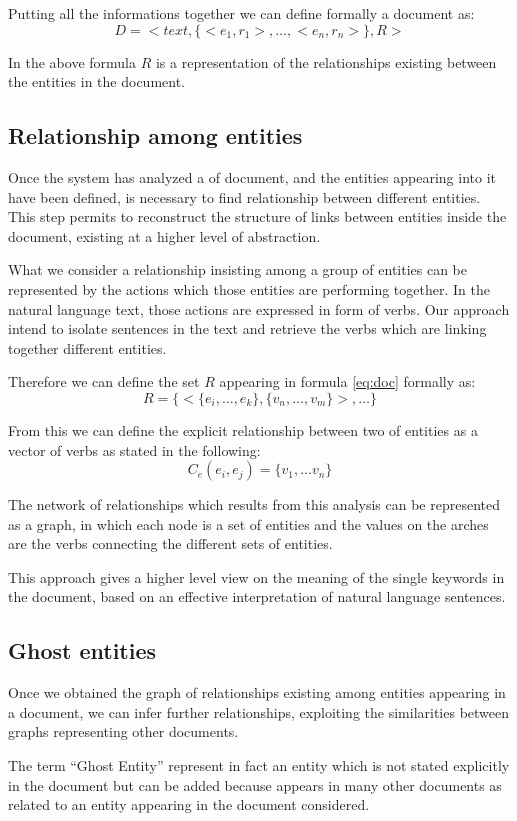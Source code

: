 \documentclass{acm_proc_article-sp-sigmod07}
\begin{document}
Putting all the informations together we can define formally a document
as:
$$
D = <text, \{<e_{1},r_{1}>, \dots, <e_{n}, r_{n}>\}, R>
\label{eq:doc}
$$

In the above formula $R$ is a representation of the relationships
existing between the entities in the document.


\subsection{Relationship among entities}
Once the system has analyzed a of document, and the entities
appearing into it have been defined, is necessary to find relationship
between different entities. This step permits to reconstruct the structure
of links between entities inside the document, existing at a
higher level of abstraction.

What we consider a relationship insisting among a group of entities can be
represented by the actions which those entities are performing together.
In the natural language text, those actions are expressed in form of
verbs. Our approach intend to isolate sentences in the text and retrieve
the verbs which are linking together different entities.

Therefore we can define the set $R$ appearing in formula \ref{eq:doc}
formally as:
$$
R = \{ <\{e_{i}, \dots, e_{k}\}, \{v_{n}, \dots, v_{m}\}>, \dots \}
$$


From this we can define the explicit relationship between two of entities as a
vector of verbs as stated in the following:
$$
C_{e}(e_{i}, e_{j}) = \{v_{1}, \dots v_{n}\}
$$

The network of relationships which results from this analysis can be
represented as a graph, in which each node is a set of entities and the
values on the arches are the verbs connecting the different sets of
entities.

This approach gives a higher level view on the meaning of the single
keywords in the document, based on an effective interpretation of natural
language sentences.

\subsection{Ghost entities}
Once we obtained the graph of relationships existing among entities
appearing in a document, we can infer further relationships, exploiting
the similarities between graphs representing other documents.

The term ``Ghost Entity'' represent in fact an entity which is not stated
explicitly in the document but can be added because appears in many other
documents as related to an entity appearing in the document considered.
\end{document}
